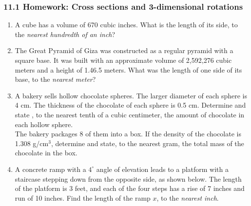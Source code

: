 \documentclass[12pt, twoside]{article}
\begin{document}
\subsubsection*{11.1 Homework: Cross sections and 3-dimensional rotations}
 \begin{enumerate}
  \item A cube has a volume of 670 cubic inches. What is the length of its side, to the \emph{nearest hundredth of an inch}? \vspace{3cm}

  \item The Great Pyramid of Giza was constructed as a regular pyramid with a square base. It was built with an approximate volume of 2,592,276 cubic meters and a height of 1.46.5 meters. What was the length of one side of its base, to the \emph{nearest meter}? \vspace{5cm}

  \item A bakery sells hollow chocolate spheres. The larger diameter of each sphere is 4 cm. The thickness of the chocolate of each sphere is 0.5 cm. Determine and state , to the nearest tenth of a cubic centimeter, the amount of chocolate in each hollow sphere.\\[4.5cm]
  The bakery packages 8 of them into a box. If the density of the chocolate is 1.308 g/$\mathrm{cm}^3$, determine and state, to the nearest gram, the total mass of the chocolate in the box.

\newpage
\item A concrete ramp with a $4^\circ$ angle of elevation leads to a platform with a staircase stepping down from the opposite side, as shown below. The length of the platform is 3 feet, and each of the four steps has a rise of 7 inches and run of 10 inches. Find the length of the ramp $x$, to the \emph{nearest inch}.\\[0.25cm]
       \vspace{5cm}


\end{enumerate}
\end{document}

